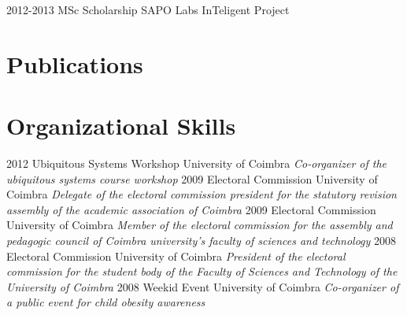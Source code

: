 \documentclass[]{friggeri-cv} %
\begin{document}
\begin{entrylist}
\entry
{2012-2013}
{MSc Scholarship}
{SAPO Labs}
{InTeligent Project}
\end{entrylist}


\section{Publications}

\begin{refsection} %
\nocite{*}
\printbibliography[sorting=chronological, type=inproceedings, title={international peer-reviewed conferences/proceedings}, notkeyword={france}, heading=subbibliography]
\end{refsection}




\section{Organizational Skills}

\begin{entrylist}
\entry
{2012}
{Ubiquitous Systems Workshop}
{University of Coimbra}
{\emph{Co-organizer of the ubiquitous systems course workshop}}
\entry
{2009}
{Electoral Commission}
{University of Coimbra}
{\emph{Delegate of the electoral commission president for the statutory revision assembly of the academic association of Coimbra}}
\entry
{2009}
{Electoral Commission}
{University of Coimbra}
{\emph{Member of the electoral commission for the assembly and pedagogic council of Coimbra university's faculty of sciences and technology}}
\entry
{2008}
{Electoral Commission}
{University of Coimbra}
{\emph{President of the electoral commission for the student body of the Faculty of Sciences and Technology of the University of Coimbra}}
\entry
{2008}
{Weekid Event}
{University of Coimbra}
{\emph{Co-organizer of a public event for child obesity awareness}}
\end{entrylist}
\end{document}
